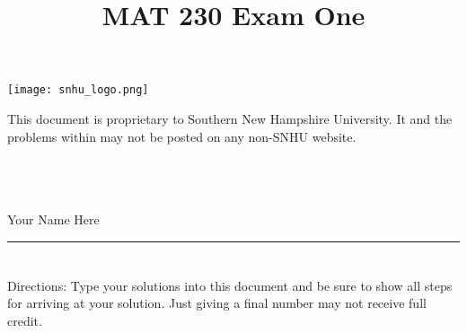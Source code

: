 \documentclass{amsart}
\theoremstyle{definition}
\theoremstyle{Exercise}
\theoremstyle{remark}
\theoremstyle{rule}
\numberwithin{equation}{section}
\begin{document}
\title{\sf MAT 230 Exam One}%


\begin{center}
\texttt{[image: snhu\_logo.png]}
\end{center}

\maketitle
This document is proprietary to Southern New Hampshire University. It and the problems within may not be posted on any non-SNHU website.\\\\\\\\
\begin{center}
Your Name Here
\end{center}

\begin{center}
\rule{\textwidth}{0.4pt}
\end{center}
\newpage
\section*{}
\section*{}
Directions: Type your solutions into this document and be sure to show all steps for arriving at your solution. Just giving a final number may not receive full credit.
\\
\end{document}
